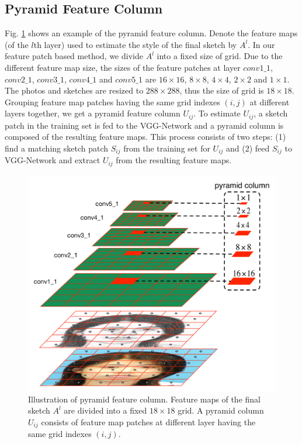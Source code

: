 \documentclass[10pt,twocolumn,letterpaper]{article}
\begin{document}
\subsection{Pyramid Feature Column} \label{subsec:pyramid_feature_column}

Fig. \ref{fig:pyramidcolumn} shows an example of the pyramid feature column. Denote the feature maps (of the $l$th layer) used to estimate the style of the final sketch by $A^{l}$. In our feature patch based method, we divide $A^{l}$ into a fixed size of grid. Due to the different feature map size, the sizes of the feature patches at layer $conv1\_1$, $conv2\_1$, $conv3\_1$, $conv4\_1$ and $conv5\_1$ are $16\times16$, $8\times8$, $4\times4$, $2\times2$ and $1\times1$. The photos and sketches are resized to $288\times288$, thus the size of grid is $18\times18$. Grouping feature map patches having the same grid indexes $(i, j)$ at different layers together, we get a pyramid feature column $U_{ij}$. To estimate $U_{ij}$, a sketch patch in the training set is fed to the VGG-Network and a pyramid column is composed of the resulting feature maps. This process consists of two steps: (1) find a matching sketch patch $S_{ij}$ from the training set for $U_{ij}$ and (2) feed $S_{ij}$ to VGG-Network and extract $U_{ij}$ from the resulting feature maps.

\begin{figure}[htbp]
\centering
\includegraphics[width=0.85\linewidth]{img/pyramidcolumn.pdf}
\caption{Illustration of pyramid feature column. Feature maps of the final sketch $A^{l}$ are divided into a fixed $18\times18$ grid. A pyramid column $U_{ij}$ consists of feature map patches at different layer having the same grid indexes $(i, j)$.}
\label{fig:pyramidcolumn}
\end{figure}
\end{document}
